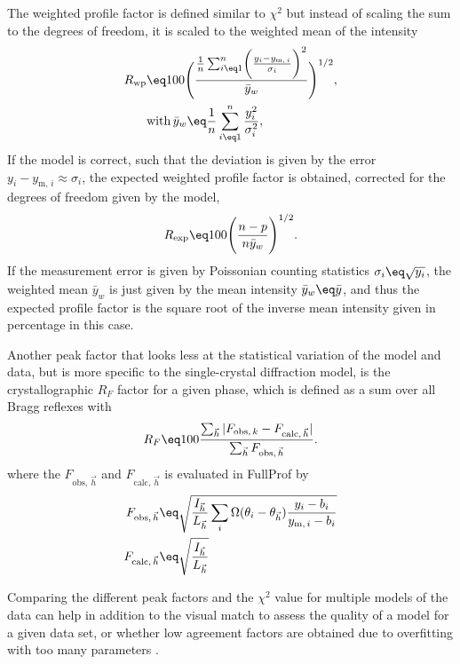 \documentclass[\main/dresen_thesis.tex]{subfiles}
\begin{document}
    The weighted profile factor is defined similar to $\chi^2$ but instead of scaling the sum to the degrees of freedom, it is scaled to the weighted mean of the intensity
    \begin{align}
      \begin{split}
        R_{\mathrm{wp}}
        &\eq 100 \Biggl(
          \frac{\frac{1}{n} \sum_{i \eq 1}^n \biggl(\frac{y_i - y_{\mathrm{m},\,i}}{\sigma_i}\biggr)^2}
               {\bar{y}_w}
          \Biggr)^{1/2},\\
        &\mathrm{with\,} \bar{y}_w \eq \frac{1}{n} \sum_{i\eq1}^n \frac{y_i^2}{\sigma_i^2},
      \end{split}
    \end{align}
    If the model is correct, such that the deviation is given by the error $y_i - y_{\mathrm{m},\,i} \approx \sigma_i$, the expected weighted profile factor is obtained, corrected for the degrees of freedom given by the model,
    \begin{align}
      R_{\mathrm{exp}} \eq 100 \Biggl( \frac{n-p}{ n \bar{y}_w } \Biggr)^{1/2}.
    \end{align}
    If the measurement error is given by Poissonian counting statistics $\sigma_i \eq \sqrt{y_i}$, the weighted mean $\bar{y}_w$ is just given by the mean intensity $\bar{y}_w \eq \bar{y}$, and thus the expected profile factor is the square root of the inverse mean intensity given in percentage in this case.

    Another peak factor that looks less at the statistical variation of the model and data, but is more specific to the single-crystal diffraction model, is the crystallographic $R_F$ factor for a given phase, which is defined as a sum over all Bragg reflexes with
    \begin{align}
      R_F \eq 100
        \frac{\sum_{\vec{h}} |F_{\mathrm{obs},\, k} - F_{\mathrm{calc},\,\vec{h}}|}
             {\sum_{\vec{h}} F_{\mathrm{obs},\, \vec{h}}}.
    \end{align}
    where the $F_{\mathrm{obs},\, \vec{h}}$ and $F_{\mathrm{calc},\,\vec{h}}$ is evaluated in FullProf by
    \begin{align}
      F_{ \mathrm{obs}, \, \vec{h} } &\eq
      \sqrt{ \frac{I_{\vec{h}}}{L_{\vec{h}}} \sum_{i} \Omega(\theta_i - \theta_{\vec{h}}) \frac{y_{i} - b_i}{y_{\mathrm{m},\,i} - b_i} } \\
      F_{\mathrm{calc},\,\vec{h}} &\eq \sqrt{\frac{I_{\vec{h}}}{L_{\vec{h}}}}
    \end{align}

    Comparing the different peak factors and the $\chi^2$ value for multiple models of the data can help in addition to the visual match to assess the quality of a model for a given data set, or \ie whether low agreement factors are obtained due to overfitting with too many parameters \cite{Toby_2006_Rfact}.
\end{document}
